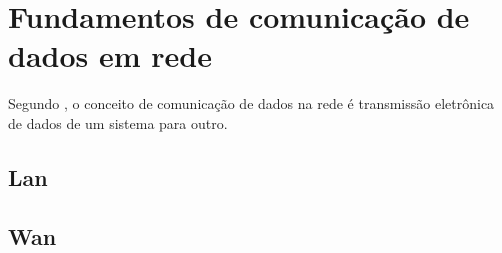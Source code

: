 \section{Fundamentos de comunicação de dados em rede}
Segundo \citet{gallo2003comunicaccao}, o conceito de comunicação de dados na rede é transmissão eletrônica de dados
de um sistema para outro.

\citealp{gallo2003comunicaccao}

\citealt{gallo2003comunicaccao}

\citeauthor{gallo2003comunicaccao}

\lipsum[1]

	\subsection{Lan}
	\lipsum[1]
	
	\subsection{Wan}
	\lipsum[1]